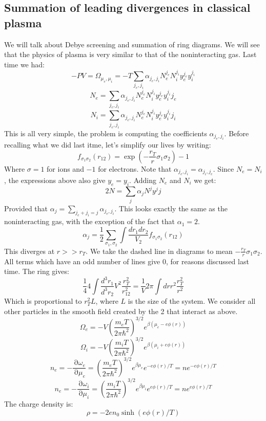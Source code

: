 \documentclass[12 pt]{article}
\DeclareMathOperator {\p} {\partial}
\begin{document}
\subsection*{Summation of leading divergences in classical plasma}
We will talk about Debye screening and summation of ring diagrams. We will see that the physics of plasma is very similar to that of the noninteracting gas. Last time we had:
\[   - PV =   \Omega_{\mu_e, \mu_i} = -T \sum_{j_e, j_i} \alpha_{j_e, j_i} N_e^{j_e} N_i^{j_i} y_e^{j_e} y_i^{j_i}     \]
\[         N_e = \sum_{j_e, j_i}     \alpha_{j_e, j_i} N_e^{j_e} N_i^{j_i} y_e^{j_e} y_i^{j_i}  j_e     \]
\[         N_i = \sum_{j_e, j_i}     \alpha_{j_e, j_i} N_e^{j_e} N_i^{j_i} y_e^{j_e} y_i^{j_i}  j_i     \]
This is all very simple, the problem is computing the coefficients $\alpha_{j_e, j_i}$. Before recalling what we did last itme, let's simplify our lives by writing:
\[      f_{\sigma_1 \sigma_2}(r_{12}) = \exp\left( - \frac{r_T}{r} \sigma_1 \sigma_2 \right) -1   \]
Where $\sigma = 1$ for ions and $-1$ for electrons. Note that $\alpha_{j_e, j_i} = \alpha_{j_i, j_e}$. Since $N_e = N_i$, the expressions above also give $y_e = y_i$. Adding $N_e$ and $N_i$ we get:
\[    2N = \sum_j \alpha_j N^j y^j j       \]
Provided that $\alpha_j = \sum_{j_e + j_i = j} \alpha_{j_e, j_i}$. This looks exactly the same as the noninteracting gas, with the exception of the fact that $\alpha_1 = 2$.
\[   \alpha_j = \frac{1}{2} \sum_{\sigma_1 , \sigma_2} \int \frac{dr_1 dr_2}{V_2}  f_{\sigma_1 \sigma_2} (r_{12})   \]
This diverges at $r>>r_T$. We take the dashed line in diagrams to mean $- \frac{r_T}{r}\sigma_1 \sigma_2$. All terms which have an odd number of lines give 0, for reasons discussed last time. The ring gives:
\[     \frac{1}{4} 4 \int \frac{d^3 r_1}{d^3 r_2}{V^2} \frac{r_T^2}{r_{12}^2} = \frac{1}{V} 2\pi \int dr r^2 \frac{r_T^2}{r^2}      \]
Which is proportional to $r_T^2 L$, where $L$ is the size of the system. We consider all other particles in the smooth field created by the 2 that interact as above.
\[       \Omega_e = - V \left( \frac{m_e T}{2\pi \hbar^2} \right)^{3/2} e^{\beta(\mu_e - e \phi(r))}     \]
\[       \Omega_i = - V \left( \frac{m_i T}{2\pi \hbar^2} \right)^{3/2} e^{\beta(\mu_i + e \phi(r))}     \]
\[     n_e = - \frac{\p \omega_e}{\p \mu_e}   = \left( \frac{m_e T}{2\pi \hbar^2} \right)^{3/2} e^{\beta \mu_e} e^{- e\phi(r)/T}  = n e^{- e\phi(r)/T} \]
\[     n_e = - \frac{\p \omega_i}{\p \mu_i}   = \left( \frac{m_i T}{2\pi \hbar^2} \right)^{3/2} e^{\beta \mu_i} e^{ e\phi(r)/T} = n e^{ e\phi(r)/T}  \]
The charge density is:
\[    \rho = - 2en_0 \sinh(e\phi(r)/T)     \]
\end{document}
